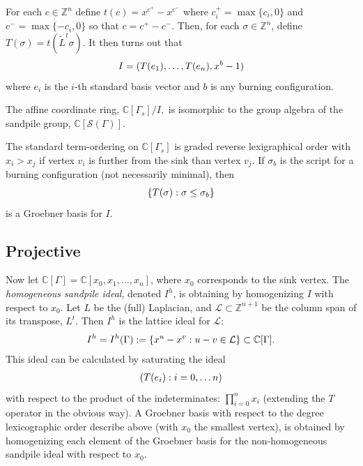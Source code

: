 \documentclass[letterpaper,10pt,english]{manual}
\begin{document}
For each $c\in\mathbb{Z}^n$ define $t(c) = x^{c^+} - x^{c^-}$ where
$c^+_i=\max\{c_i,0\}$ and $c^-=\max\{-c_i,0\}$ so that $c=c^+-c^-$.
Then, for each $\sigma\in\mathbb{Z}^n$, define $T(\sigma) =
t(\tilde{L}^t\sigma)$.  It then turns out that
\begin{gather}
\begin{split}I = (T(e_1),\dots,T(e_n),x^b-1)\end{split}\notag
\end{gather}
where $e_i$ is the $i$-th standard basis vector and $b$ is any burning
configuration.

The affine coordinate ring, $\mathbb{C}[\Gamma_s]/I,$ is isomorphic to the group
algebra of the sandpile group, $\mathbb{C}[\mathcal{S}(\Gamma)].$

The standard term-ordering on $\mathbb{C}[\Gamma_s]$ is graded reverse
lexigraphical order with $x_i>x_j$ if vertex $v_i$ is further from the sink than
vertex $v_j$.  If $\sigma_b$ is the script for a burning configuration (not
necessarily minimal), then
\begin{gather}
\begin{split}\{T(\sigma): \sigma\leq\sigma_b\}\end{split}\notag
\end{gather}
is a Groebner basis for $I$.


\subsection{Projective}

Now let $\mathbb{C}[\Gamma]=\mathbb{C}[x_0,x_1,\dots,x_n]$, where $x_0$
corresponds to the sink vertex.  The \emph{homogeneous sandpile ideal}, denoted
$I^h$, is obtaining by homogenizing $I$ with respect to $x_0$.  Let $L$ be the
(full) Laplacian, and $\mathcal{L}\subset\mathbb{Z}^{n+1}$ be the column span of
its transpose, $L^t.$  Then $I^h$ is the lattice ideal for $\mathcal{L}$:
\begin{gather}
\begin{split}I^h = I^h(\Gamma) := \{x^u-x^v: u-v \in\mathcal{L}\}\subset\mathbb{C}[\Gamma].\end{split}\notag
\end{gather}
This ideal can be calculated by saturating the ideal
\begin{gather}
\begin{split}(T(e_i): i=0,\dots n)\end{split}\notag
\end{gather}
with respect to the product of the indeterminates: $\prod_{i=0}^nx_i$ (extending
the $T$ operator in the obvious way).  A Groebner basis with respect to the
degree lexicographic order describe above (with $x_0$ the smallest vertex), is
obtained by homogenizing each element of the Groebner basis for the
non-homogeneous sandpile ideal with respect to $x_0.$
\end{document}
